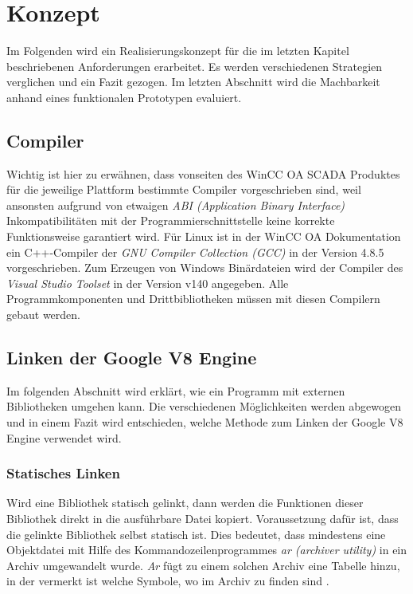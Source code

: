 \chapter{Konzept}
\label{cha:Konzept}

Im Folgenden wird ein Realisierungskonzept für die im letzten Kapitel beschriebenen Anforderungen erarbeitet. Es werden verschiedenen
Strategien verglichen und ein Fazit gezogen. Im letzten Abschnitt wird die Machbarkeit anhand eines funktionalen Prototypen 
evaluiert.

\section{Compiler}

Wichtig ist hier zu erwähnen, dass vonseiten des WinCC OA SCADA Produktes für die jeweilige Plattform bestimmte Compiler
vorgeschrieben sind, weil ansonsten aufgrund von etwaigen \textit{ABI (Application Binary Interface)} Inkompatibilitäten mit 
der Programmierschnittstelle keine korrekte Funktionsweise garantiert wird. Für Linux ist in der WinCC OA Dokumentation ein C++-Compiler der 
\textit{GNU Compiler Collection (GCC)} in der Version 4.8.5 vorgeschrieben. Zum Erzeugen von Windows Binärdateien wird der Compiler
des \textit{Visual Studio Toolset} in der Version v140 angegeben. Alle Programmkomponenten und Drittbibliotheken müssen mit diesen
Compilern gebaut werden.

\section{Linken der Google V8 Engine}

Im folgenden Abschnitt wird erklärt, wie ein Programm mit externen Bibliotheken umgehen kann. Die verschiedenen Möglichkeiten
werden abgewogen und in einem Fazit wird entschieden, welche Methode zum Linken der Google V8 Engine verwendet wird.

\subsection{Statisches Linken}

Wird eine Bibliothek statisch gelinkt, dann werden die Funktionen dieser Bibliothek direkt in die ausführbare Datei kopiert.
Voraussetzung dafür ist, dass die gelinkte Bibliothek selbst statisch ist. Dies bedeutet, dass mindestens eine Objektdatei mit Hilfe des
Kommandozeilenprogrammes \textit{ar (archiver utility)} in ein Archiv umgewandelt wurde. \textit{Ar} fügt zu einem solchen Archiv eine 
Tabelle hinzu, in der vermerkt ist welche Symbole, wo im Archiv zu finden sind \cite{staticLinking}.

